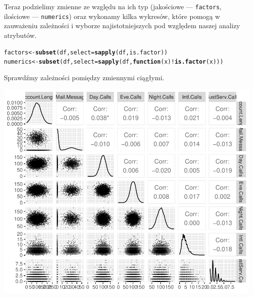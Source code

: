\documentclass{article}\usepackage[]{graphicx}\usepackage[]{color}
\makeatletter
\def\maxwidth{ %
  \ifdim\Gin@nat@width>\linewidth
    \linewidth
  \else
    \Gin@nat@width
  \fi
}
\newcommand{\hlopt}[1]{\textcolor[rgb]{0,0,0}{#1}}%
\newcommand{\hlstd}[1]{\textcolor[rgb]{0.345,0.345,0.345}{#1}}%
\newcommand{\hlkwa}[1]{\textcolor[rgb]{0.161,0.373,0.58}{\textbf{#1}}}%
\newcommand{\hlkwb}[1]{\textcolor[rgb]{0.69,0.353,0.396}{#1}}%
\newcommand{\hlkwc}[1]{\textcolor[rgb]{0.333,0.667,0.333}{#1}}%
\newcommand{\hlkwd}[1]{\textcolor[rgb]{0.737,0.353,0.396}{\textbf{#1}}}%
\newenvironment{kframe}{%
 \def\at@end@of@kframe{}%
 \ifinner\ifhmode%
  \def\at@end@of@kframe{\end{minipage}}%
  \begin{minipage}{\columnwidth}%
 \fi\fi%
 \def\FrameCommand##1{\hskip\@totalleftmargin \hskip-\fboxsep
 \colorbox{shadecolor}{##1}\hskip-\fboxsep
     \hskip-\linewidth \hskip-\@totalleftmargin \hskip\columnwidth}%
 \MakeFramed {\advance\hsize-\width
   \@totalleftmargin\z@ \linewidth\hsize
   \@setminipage}}%
 {\par\unskip\endMakeFramed%
 \at@end@of@kframe}
\newenvironment{knitrout}{}{} %
\makeatother
\begin{document}
Teraz podzielimy zmienne ze względu na ich typ (jakościowe --- \verb|factors|, ilościowe --- \verb|numerics|) oraz wykonamy kilka wykresów, które pomogą w zauważeniu zależności i wyborze najistotniejszych pod względem naszej analizy atrybutów.
\begin{knitrout}
\color{fgcolor}\begin{kframe}
\begin{alltt}
\hlstd{factors} \hlkwb{<-} \hlkwd{subset}\hlstd{(df,} \hlkwc{select}\hlstd{=}\hlkwd{sapply}\hlstd{(df, is.factor))}
\hlstd{numerics} \hlkwb{<-} \hlkwd{subset}\hlstd{(df,} \hlkwc{select}\hlstd{=}\hlkwd{sapply}\hlstd{(df,} \hlkwa{function}\hlstd{(}\hlkwc{x}\hlstd{)} \hlopt{!}\hlkwd{is.factor}\hlstd{(x)))}
\end{alltt}
\end{kframe}
\end{knitrout}

Sprawdźmy zależności pomiędzy zmiennymi ciągłymi.
\begin{knitrout}
\color{fgcolor}

{\centering \includegraphics[width=\maxwidth]{figure/Wykresy_dla_zmiennych_calkowitych-1} 

}



\end{knitrout}
\end{document}
